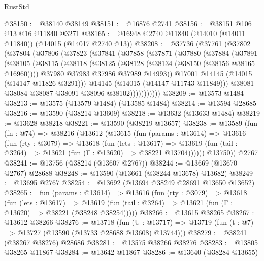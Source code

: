 \begin{lexlean}{RustStd}
\begin{coremodule}
@38150 := @38140 @38149
@38151 := @16876 @2741
@38156 := @38151 @106 @13 @16 @11840 @3271
@38165 := @16948 @2740 @11840 (@14010 (@14011 @11840)) (@14015 (@14017 @2740 @13))
@38208 := @37736
    (@37761
      (@37802
        (@37804
          (@37806
            (@37823
              (@37841
                (@37858
                  (@37871
                    (@37880
                      (@37884
                        (@37891
                          (@38105
                            (@38115
                              (@38118
                                (@38125
                                  (@38128 (@38134 (@38150 (@38156 @38165 @16960))))
                                  @37980
                                  @37983
                                  @37986
                                  @37989
                                  @14993))
                              @17001
                              @14145
                              (@14015 (@14147 @11826 @3291)))
                            @14145
                            (@14015 (@14147 @11743 @11849)))
                          @38081
                          @38084
                          @38087
                          @38091
                          @38096
                          @38102)))))))))))
@38209 := @13573 @1484
@38213 := @13575 (@13579 @1484) (@13585 @1484)
@38214 := @13594 @28685
@38216 := @13590 (@38214 @13609)
@38218 := @13632 (@13633 @1484)
@38219 := @13628 @38218
@38221 := @13590 (@38219 @13657)
@38238 := @13589
    (fun (fn : @74) =>
    @38216
      (@13612
        (@13615
          (fun (params : @13614) =>
          @13616
            (fun (rty : @3079) =>
            @13618
              (fun (lets : @13617) =>
              @13619 (fun (tail : @3264) => @13621 (fun (Γ : @13620) => @38221 @13704))))))
        @13750))
    @2767
@38241 := @13756 (@38214 (@13607 @2767))
@38244 := @13669 (@13670 @2767) @28688
@38248 := @13590 (@13661 (@38244 @13678) @13682)
@38249 := @13695 @2767
@38254 := @13692 (@13694 @38249 @28691 @13650 @13652)
@38265 := fun (params : @13614) =>
  @13616
    (fun (rty : @3079) =>
    @13618
      (fun (lets : @13617) =>
      @13619 (fun (tail : @3264) => @13621 (fun (Γ : @13620) => @38221 (@38248 @38254)))))
@38266 := @13615 @38265
@38267 := @13612 @38266
@38276 := @13718
    (fun (U : @13717) => @13719 (fun (t : @7) => @13727 (@13590 (@13733 @28688 @13608) @13744)))
@38279 := @38241 (@38267 @38276) @28686
@38281 := @13575 @38266 @38276
@38283 := @13805 @38265 @11867
@38284 := @13642 @11867
@38286 := @13640 (@38284 @13655)

\end{coremodule}
\end{lexlean}

